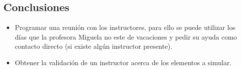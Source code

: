 \subsection{Conclusiones}\label{conclusiones}

\begin{itemize}
\itemsep1pt\parskip0pt
\item
  Programar una reunión con los instructores, para ello se puede
  utilizar los días que la profesora Miguela no este de vacaciones y
  pedir su ayuda como contacto directo (si existe algún instructor
  presente).
\item
  Obtener la validación de un instructor acerca de los elementos a
  simular.
\end{itemize}
